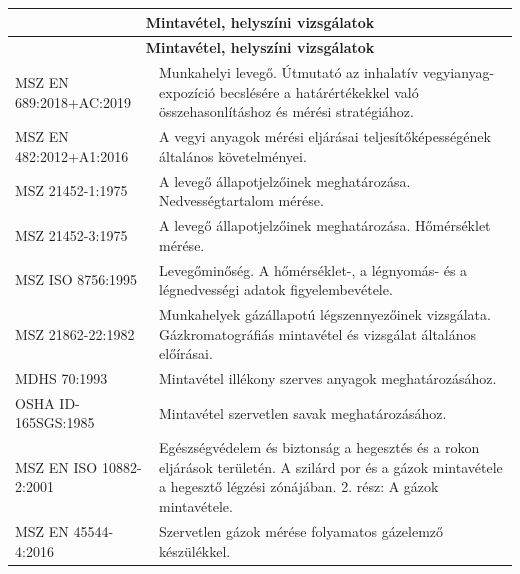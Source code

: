 \documentclass[a4paper,12pt]{article}
\renewcommand{\arraystretch}{0.5}
\begin{document}
		\renewcommand{\arraystretch}{1.1} %
		\footnotesize %

		\begin{longtable}{|p{5cm}|p{10cm}|}
			\hline
			\multicolumn{2}{|c|}{\textbf{Mintavétel, helyszíni vizsgálatok}} \\
			\hline
			\endfirsthead

			\multicolumn{2}{|c|}{\textbf{Mintavétel, helyszíni vizsgálatok}} \\
			\hline
			\endhead

			\endfoot

			\hline
			\endlastfoot

			MSZ EN 689:2018+AC:2019 & Munkahelyi levegő. Útmutató az inhalatív vegyianyag-expozíció becslésére a határértékekkel való összehasonlításhoz és mérési stratégiához. \\ \hline MSZ EN 482:2012+A1:2016 & A vegyi anyagok mérési eljárásai teljesítőképességének általános követelményei. \\ \hline MSZ 21452-1:1975 & A levegő állapotjelzőinek meghatározása. Nedvességtartalom mérése. \\ \hline MSZ 21452-3:1975 & A levegő állapotjelzőinek meghatározása. Hőmérséklet mérése. \\ \hline MSZ ISO 8756:1995 & Levegőminőség. A hőmérséklet-, a légnyomás- és a légnedvességi adatok figyelembevétele. \\ \hline MSZ 21862-22:1982 & Munkahelyek gázállapotú légszennyezőinek vizsgálata. Gázkromatográfiás mintavétel és vizsgálat általános előírásai. \\ \hline MDHS 70:1993 & Mintavétel illékony szerves anyagok meghatározásához. \\ \hline OSHA ID-165SGS:1985 & Mintavétel szervetlen savak meghatározásához. \\ \hline MSZ EN ISO 10882-2:2001 & Egészségvédelem és biztonság a hegesztés és a rokon eljárások területén. A szilárd por és a gázok mintavétele a hegesztő légzési zónájában. 2. rész: A gázok mintavétele. \\ \hline MSZ EN 45544-4:2016 & Szervetlen gázok mérése folyamatos gázelemző készülékkel. \\ \hline 

		\end{longtable}
\end{document}
